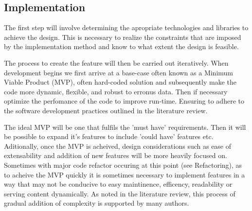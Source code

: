   \subsection{Implementation}
    The first step will involve determining the apropriate technologies and libraries to achieve the design. This is necessary to realize the constraints that are imposed by the implementation method and know to what extent the design is feasible.
    \par
    The process to create the feature will then be carried out iteratively. When development begins we first arrive at a base-case often known as a Minimum Viable Product (MVP), often hard-coded solution and subsequently make the code more dynamic, flexible, and robust to erronus data. Then if necessary optimize the perfomance of the code to improve run-time. Ensuring to adhere to the software development practices outlined in the literature review.
    \par
    The ideal MVP will be one that fulfils the 'must have' requirements. Then it will be possible to expand it's features to include 'could have' features etc. Aditionally, once the MVP is acheived, design considerations such as ease of extensability and addition of new features will be more heavily focused on. Sometimes with major code refactor occuring at this point (see Refactoring), as to acheive the MVP quickly it is sometimes necessary to implement features in a way that may not be conducive to easy maintinence, efficency, readability or serving content dynamically. As noted in the literature review, this process of gradual addition of complexity is supported by many authors.

